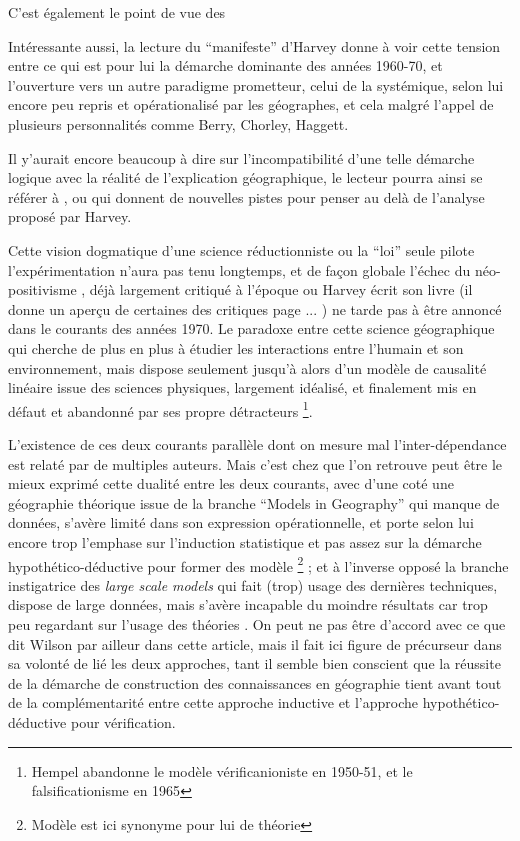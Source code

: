 C'est également le point de vue des 



Intéressante aussi, la lecture du \enquote{manifeste} \autocite[31]{Barnes2006} d'Harvey donne à voir cette tension entre ce qui est pour lui la démarche dominante des années 1960-70, et l'ouverture vers un autre paradigme prometteur, celui de la systémique, selon lui encore peu repris et opérationalisé par les géographes, et cela malgré l'appel de plusieurs personnalités comme Berry, Chorley, Haggett. 






Il y'aurait encore beaucoup à dire sur l'incompatibilité d'une telle démarche logique avec la réalité de l'explication géographique, le lecteur pourra ainsi se référer à \textcite{Gregory1978}, ou \textcite{Gale1972} qui donnent de nouvelles pistes pour penser au delà de l'analyse proposé par Harvey.

Cette vision dogmatique d'une science réductionniste ou la \enquote{loi} seule pilote l’expérimentation n'aura pas tenu longtemps, et de façon globale l’échec du néo-positivisme \autocite[147]{Ouelbani2006}, déjà largement critiqué à l'époque ou Harvey écrit son livre (il donne un aperçu de certaines des critiques page ... ) ne tarde pas à être annoncé dans le courants des années 1970. Le paradoxe entre cette science géographique qui cherche de plus en plus à étudier les interactions entre l'humain et son environnement, mais dispose seulement jusqu'à alors d'un modèle de causalité linéaire issue des sciences physiques, largement idéalisé, et finalement mis en défaut et abandonné par ses propre détracteurs \footnote {Hempel abandonne le modèle vérificanioniste en 1950-51, et le falsificationisme en 1965}.

L'existence de ces deux courants parallèle dont on mesure mal l'inter-dépendance est relaté par de multiples auteurs. Mais c'est chez \autocite{Wilson1972} que l'on retrouve peut être le mieux exprimé cette dualité entre les deux courants, avec d'une coté une géographie théorique issue de la branche \foreignquote{english}{Models in Geography} qui manque de données, s'avère limité dans son expression opérationnelle, et porte selon lui encore trop l'emphase sur l'induction statistique et pas assez sur la démarche hypothético-déductive pour former des modèle \footnote{Modèle est ici synonyme pour lui de théorie} ; et à l'inverse opposé la branche instigatrice des \textit{large scale models} qui fait (trop) usage des dernières techniques, dispose de large données, mais s'avère incapable du moindre résultats car trop peu regardant sur l'usage des théories \autocite[10]{Batty1994}. On peut ne pas être d'accord avec ce que dit Wilson par ailleur dans cette article, mais il fait ici figure de précurseur dans sa volonté de lié les deux approches, tant il semble bien conscient que la réussite de la démarche de construction des connaissances en géographie tient avant tout de la complémentarité entre cette approche inductive et l'approche hypothético-déductive pour vérification.

